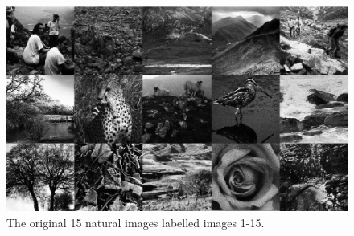 \begin{figure}
    \centering
    \includegraphics[scale=0.4]{figures/Figure1.png}
    \caption{The original 15 natural images labelled images 1-15.}
    \label{fig:Figure1}
\end{figure}

